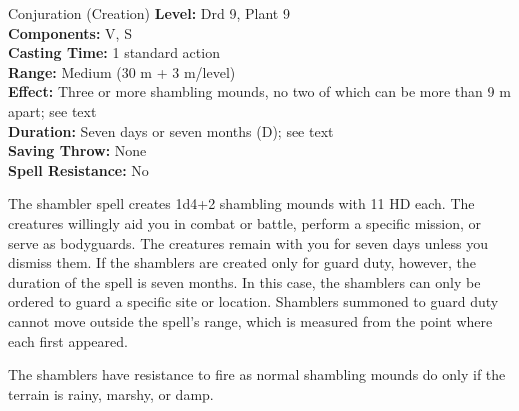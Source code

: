{Conjuration (Creation)}
{
	\textbf{Level:}
	Drd 9, Plant 9\\
	\textbf{Components:}
	V, S\\
	\textbf{Casting Time:}
	1 standard action\\
	\textbf{Range:}
	Medium (30 m + 3 m/level)\\
	\textbf{Effect:}
	Three or more shambling mounds, no two of which can be more than 9 m apart; see text\\
	\textbf{Duration:}
	Seven days or seven months (D); see text\\
	\textbf{Saving Throw:}
	None\\
	\textbf{Spell Resistance:}
	No\\
}
{
	The shambler spell creates 1d4+2 shambling mounds with 11 HD each. The creatures willingly aid you in combat or battle, perform a specific mission, or serve as bodyguards. The creatures remain with you for seven days unless you dismiss them. If the shamblers are created only for guard duty, however, the duration of the spell is seven months. In this case, the shamblers can only be ordered to guard a specific site or location. Shamblers summoned to guard duty cannot move outside the spell's range, which is measured from the point where each first appeared.

	The shamblers have resistance to fire as normal shambling mounds do only if the terrain is rainy, marshy, or damp.

}
